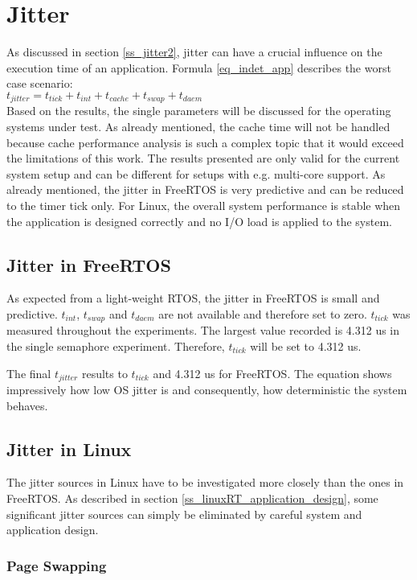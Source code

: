 \section{Jitter}
As discussed in section \ref{ss_jitter2}, jitter can have a crucial influence on the execution time of an application.
Formula \ref{eq_indet_app} describes the worst case scenario:\\
$t_{jitter} = t_{tick} + t_{int} + t_{cache} + t_{swap} + t_{daem}$ \\
Based on the results, the single parameters will be discussed for the operating systems under test. 
As already mentioned, the cache time will not be handled because cache performance analysis is such a complex topic that it would exceed the limitations of this work.
The results presented are only valid for the current system setup and can be different for setups with e.g. multi-core support.
As already mentioned, the jitter in FreeRTOS is very predictive and can be reduced to the timer tick only.
For Linux, the overall system performance is stable when the application is designed correctly and no \ac{I/O} load is applied to the system.

\subsection{Jitter in FreeRTOS}
As expected from a light-weight \ac{RTOS}, the jitter in FreeRTOS is small and predictive.
$ t_{int}$,  $t_{swap} $ and $t_{daem}$ are not available and therefore set to zero. 
$ t_{tick} $ was measured throughout the experiments. 
The largest value recorded is 4.312 us in the single semaphore experiment.  
Therefore, $ t_{tick} $ will be set to 4.312 us.
\par
The final $t_{jitter}$ results to $ t_{tick} $ and 4.312 us for FreeRTOS.
The equation shows impressively how low \ac{OS} jitter is and consequently, how deterministic the system behaves.  
 
\subsection{Jitter in Linux}\label{ss_jitter_in_linux}
The jitter sources in Linux have to be investigated more closely than the ones in FreeRTOS.
As described in section \ref{ss_linuxRT_application_design}, some significant jitter sources can simply be eliminated by careful system and application design.

\subsubsection{Page Swapping} 
 
